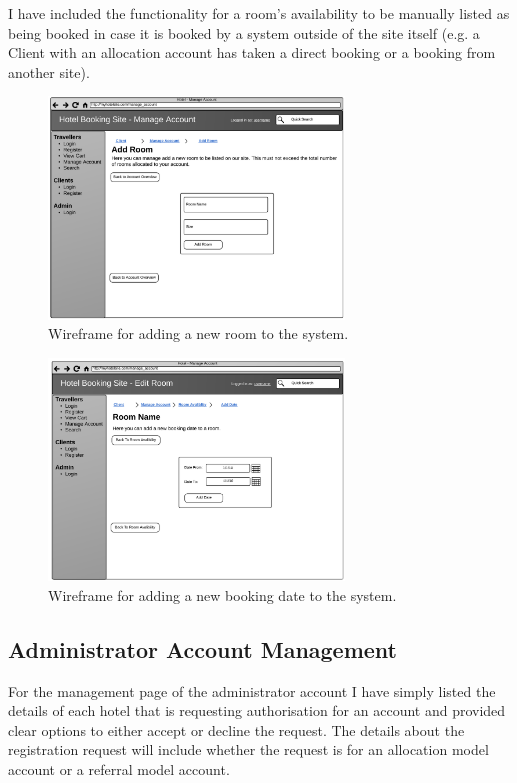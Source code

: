 \documentclass{article}
\begin{document}
I have included the functionality for a room's availability to be manually listed as being booked in case it is booked by a system outside of the site itself (e.g. a Client with an allocation account has taken a direct booking or a booking from another site).

\begin{figure}[H]
\centering
\includegraphics[width=0.7\textwidth]{img/wireframes/AddRoom.png}
\caption{Wireframe for adding a new room to the system.}
\label{fig:wireframe-client-add-room}
\end{figure}

\begin{figure}[H]
\centering
\includegraphics[width=0.7\textwidth]{img/wireframes/AddDate.png}
\caption{Wireframe for adding a new booking date to the system.}
\label{fig:wireframe-client-add-date}
\end{figure}

\subsection{Administrator Account Management}
For the management page of the administrator account I have simply listed the details of each hotel that is requesting authorisation for an account and provided clear options to either accept or decline the request. The details about the registration request will include whether the request is for an allocation model account or a referral model account.
\end{document}
